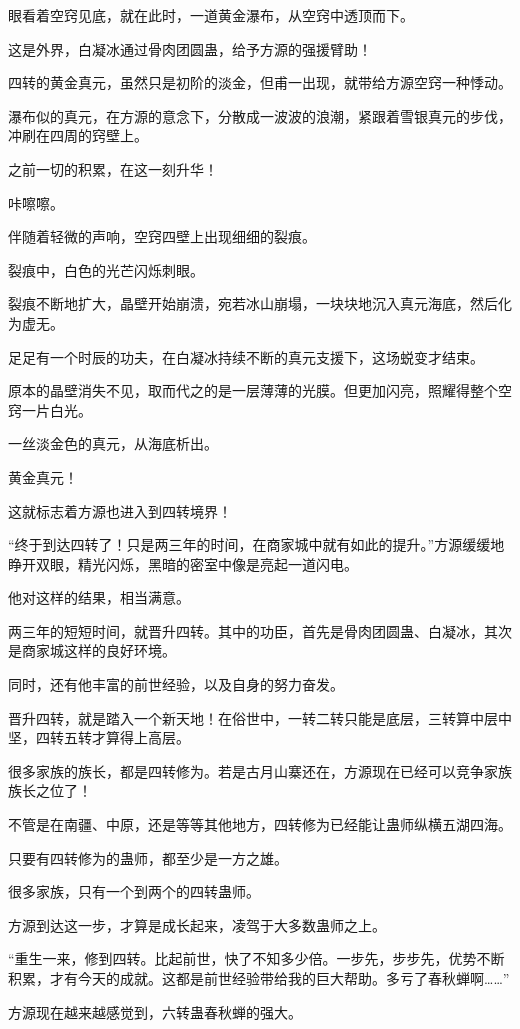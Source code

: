 \begin{this_body}
眼看着空窍见底，就在此时，一道黄金瀑布，从空窍中透顶而下。

这是外界，白凝冰通过骨肉团圆蛊，给予方源的强援臂助！

四转的黄金真元，虽然只是初阶的淡金，但甫一出现，就带给方源空窍一种悸动。

瀑布似的真元，在方源的意念下，分散成一波波的浪潮，紧跟着雪银真元的步伐，冲刷在四周的窍壁上。

之前一切的积累，在这一刻升华！

咔嚓嚓。

伴随着轻微的声响，空窍四壁上出现细细的裂痕。

裂痕中，白色的光芒闪烁刺眼。

裂痕不断地扩大，晶壁开始崩溃，宛若冰山崩塌，一块块地沉入真元海底，然后化为虚无。

足足有一个时辰的功夫，在白凝冰持续不断的真元支援下，这场蜕变才结束。

原本的晶壁消失不见，取而代之的是一层薄薄的光膜。但更加闪亮，照耀得整个空窍一片白光。

一丝淡金色的真元，从海底析出。

黄金真元！

这就标志着方源也进入到四转境界！

“终于到达四转了！只是两三年的时间，在商家城中就有如此的提升。”方源缓缓地睁开双眼，精光闪烁，黑暗的密室中像是亮起一道闪电。

他对这样的结果，相当满意。

两三年的短短时间，就晋升四转。其中的功臣，首先是骨肉团圆蛊、白凝冰，其次是商家城这样的良好环境。

同时，还有他丰富的前世经验，以及自身的努力奋发。

晋升四转，就是踏入一个新天地！在俗世中，一转二转只能是底层，三转算中层中坚，四转五转才算得上高层。

很多家族的族长，都是四转修为。若是古月山寨还在，方源现在已经可以竞争家族族长之位了！

不管是在南疆、中原，还是等等其他地方，四转修为已经能让蛊师纵横五湖四海。

只要有四转修为的蛊师，都至少是一方之雄。

很多家族，只有一个到两个的四转蛊师。

方源到达这一步，才算是成长起来，凌驾于大多数蛊师之上。

“重生一来，修到四转。比起前世，快了不知多少倍。一步先，步步先，优势不断积累，才有今天的成就。这都是前世经验带给我的巨大帮助。多亏了春秋蝉啊……”

方源现在越来越感觉到，六转蛊春秋蝉的强大。


\end{this_body}
